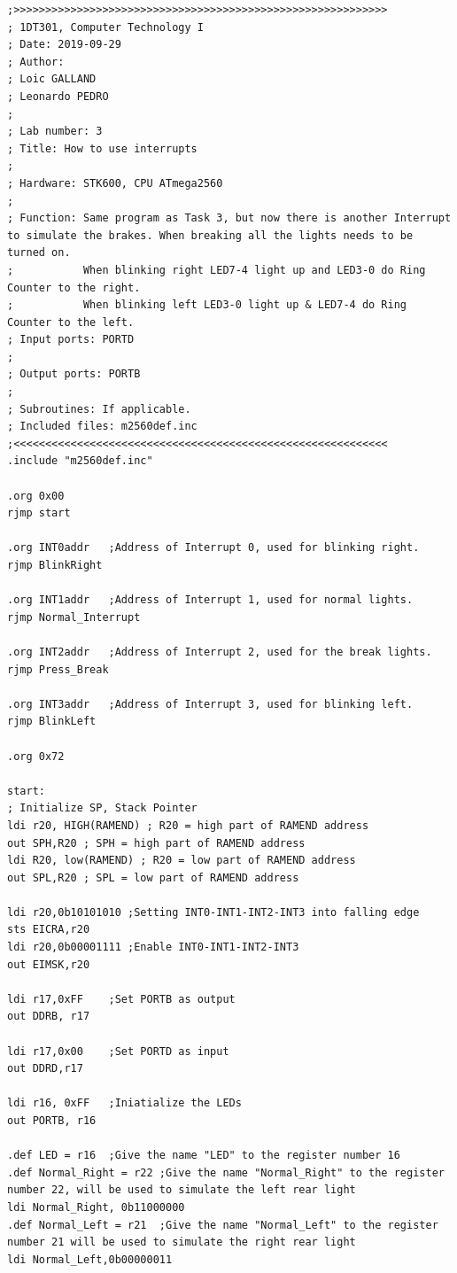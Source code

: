 \documentclass[a4paper,12pt]{article}
\begin{document}
\lstset{style=Asm}
\begin{lstlisting}
;>>>>>>>>>>>>>>>>>>>>>>>>>>>>>>>>>>>>>>>>>>>>>>>>>>>>>>>>>>>
; 1DT301, Computer Technology I
; Date: 2019-09-29
; Author:
; Loic GALLAND
; Leonardo PEDRO
;
; Lab number: 3
; Title: How to use interrupts
;
; Hardware: STK600, CPU ATmega2560
;
; Function: Same program as Task 3, but now there is another Interrupt to simulate the brakes. When breaking all the lights needs to be turned on.
;			When blinking right LED7-4 light up and LED3-0 do Ring Counter to the right.
;			When blinking left LED3-0 light up & LED7-4 do Ring Counter to the left.
; Input ports: PORTD
;
; Output ports: PORTB
;
; Subroutines: If applicable.
; Included files: m2560def.inc
;<<<<<<<<<<<<<<<<<<<<<<<<<<<<<<<<<<<<<<<<<<<<<<<<<<<<<<<<<<<
.include "m2560def.inc"

.org 0x00
rjmp start

.org INT0addr	;Address of Interrupt 0, used for blinking right.
rjmp BlinkRight	

.org INT1addr	;Address of Interrupt 1, used for normal lights.
rjmp Normal_Interrupt

.org INT2addr	;Address of Interrupt 2, used for the break lights.
rjmp Press_Break

.org INT3addr	;Address of Interrupt 3, used for blinking left.
rjmp BlinkLeft

.org 0x72

start:
; Initialize SP, Stack Pointer
ldi r20, HIGH(RAMEND) ; R20 = high part of RAMEND address
out SPH,R20 ; SPH = high part of RAMEND address
ldi R20, low(RAMEND) ; R20 = low part of RAMEND address
out SPL,R20 ; SPL = low part of RAMEND address

ldi r20,0b10101010 ;Setting INT0-INT1-INT2-INT3 into falling edge
sts EICRA,r20
ldi r20,0b00001111 ;Enable INT0-INT1-INT2-INT3
out EIMSK,r20

ldi r17,0xFF	;Set PORTB as output
out DDRB, r17

ldi r17,0x00	;Set PORTD as input
out DDRD,r17

ldi r16, 0xFF	;Iniatialize the LEDs
out PORTB, r16

.def LED = r16	;Give the name "LED" to the register number 16
.def Normal_Right = r22	;Give the name "Normal_Right" to the register number 22, will be used to simulate the left rear light
ldi Normal_Right, 0b11000000
.def Normal_Left = r21	;Give the name "Normal_Left" to the register number 21 will be used to simulate the right rear light
ldi Normal_Left,0b00000011


\end{lstlisting}
\end{document}
